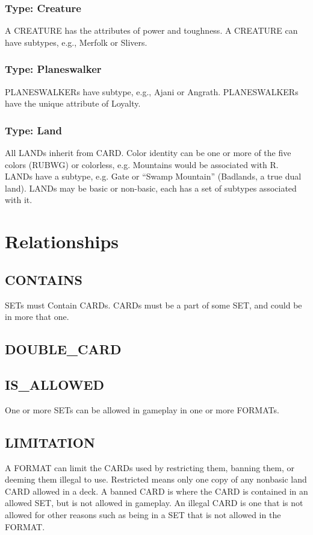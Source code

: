 \documentclass{article}
\begin{document}
\subsubsection{Type: Creature}
A CREATURE has the attributes of power and toughness. %
A CREATURE can have subtypes, e.g., Merfolk or Slivers.
\subsubsection{Type: Planeswalker}
PLANESWALKERs have subtype, e.g., Ajani or Angrath.
PLANESWALKERs have the unique attribute of Loyalty.
\subsubsection{Type: Land}
All LANDs inherit from CARD.
Color identity can be one or more of the five colors (RUBWG) or colorless, e.g.  Mountains would be associated with R.
LANDs have a subtype, e.g. Gate or “Swamp Mountain” (Badlands, a true dual land).
LANDs may be basic or non-basic, each has a set of subtypes associated with it.
\section{Relationships}
\subsection{CONTAINS}
SETs must Contain CARDs.
CARDs must be a part of some SET, and could be in more that one.
\subsection{DOUBLE\_CARD}
\subsection{IS\_ALLOWED}
One or more SETs can be allowed in gameplay in one or more FORMATs.
\subsection{LIMITATION}
A FORMAT can limit the CARDs used by restricting them, banning them, or deeming them illegal to use.
Restricted means only one copy of any nonbasic land CARD allowed in a deck.
A banned CARD is where the CARD is contained in an allowed SET, but is not allowed in gameplay.
An illegal CARD is one that is not allowed for other reasons such as being in a SET that is not allowed in the FORMAT.
\end{document}
